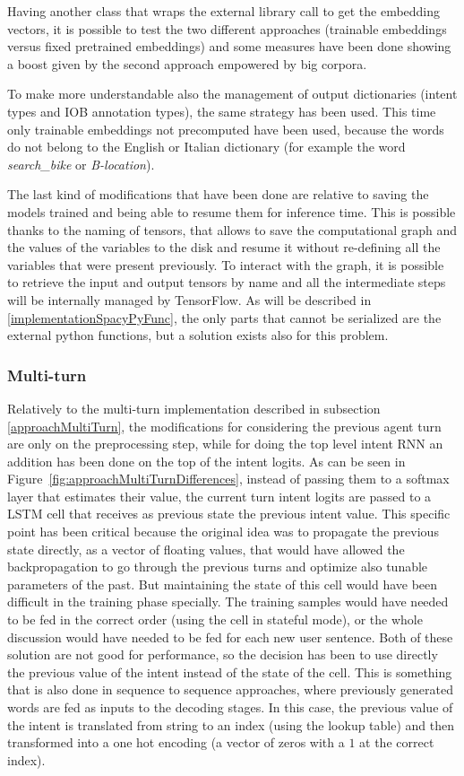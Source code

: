 Having another class that wraps the external library call to get the embedding vectors, it is possible to test the two different approaches (trainable embeddings versus fixed pretrained embeddings) and some measures have been done showing a boost given by the second approach empowered by big corpora.

To make more understandable also the management of output dictionaries (intent types and IOB annotation types), the same strategy has been used. This time only trainable embeddings not precomputed have been used, because the words do not belong to the English or Italian dictionary (for example the word \textit{search\_bike} or \textit{B-location}).

The last kind of modifications that have been done are relative to saving the models trained and being able to resume them for inference time. This is possible thanks to the naming of tensors, that allows to save the computational graph and the values of the variables to the disk and resume it without re-defining all the variables that were present previously. To interact with the graph, it is possible to retrieve the input and output tensors by name and all the intermediate steps will be internally managed by TensorFlow. As will be described in \ref{implementationSpacyPyFunc}, the only parts that cannot be serialized are the external python functions, but a solution exists also for this problem.

\subsubsection{Multi-turn}
Relatively to the multi-turn implementation described in subsection \ref{approachMultiTurn}, the modifications for considering the previous agent turn are only on the preprocessing step, while for doing the top level intent RNN an addition has been done on the top of the intent logits. As can be seen in Figure~\ref{fig:approachMultiTurnDifferences}, instead of passing them to a softmax layer that estimates their value, the current turn intent logits are passed to a LSTM cell that receives as previous state the previous intent value. This specific point has been critical because the original idea was to propagate the previous state directly, as a vector of floating values, that would have allowed the backpropagation to go through the previous turns and optimize also tunable parameters of the past. But maintaining the state of this cell would have been difficult in the training phase specially. The training samples would have needed to be fed in the correct order (using the cell in stateful mode), or the whole discussion would have needed to be fed for each new user sentence. Both of these solution are not good for performance, so the decision has been to use directly the previous value of the intent instead of the state of the cell. This is something that is also done in sequence to sequence approaches, where previously generated words are fed as inputs to the decoding stages. In this case, the previous value of the intent is translated from string to an index (using the lookup table) and then transformed into a one hot encoding (a vector of zeros with a  \( 1 \) at the correct index).

